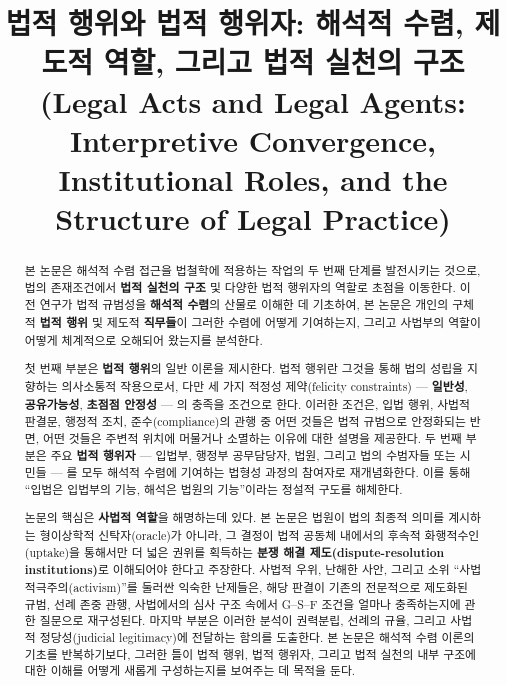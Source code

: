 \documentclass[12pt,a4paper]{article}
\title{%
  \hangulstrongfont 법적 행위와 법적 행위자: 해석적 수렴, 제도적 역할, 그리고 법적 실천의 구조 \\[4pt]
  \normalsize (Legal Acts and Legal Agents: Interpretive Convergence, Institutional Roles, and the Structure of Legal Practice)
}
\begin{document}
\maketitle
\tableofcontents  %
\newpage          %

\begin{abstract}

본 논문은 해석적 수렴 접근을 법철학에 적용하는 작업의 두 번째 단계를
발전시키는 것으로, 법의 존재조건에서 \textbf{법적 실천의 구조} 및 다양한
법적 행위자의 역할로 초점을 이동한다. 이전 연구가 법적 규범성을
\textbf{해석적 수렴}의 산물로 이해한 데 기초하여, 본 논문은 개인의
구체적 \textbf{법적 행위} 및 제도적 \textbf{직무들}이 그러한 수렴에
어떻게 기여하는지, 그리고 사법부의 역할이 어떻게 체계적으로 오해되어
왔는지를 분석한다.

첫 번째 부분은 \textbf{법적 행위}의 일반 이론을 제시한다. 법적 행위란
그것을 통해 법의 성립을 지향하는 의사소통적 작용으로서, 다만 세 가지
적정성 제약(felicity constraints) --- \textbf{일반성},
\textbf{공유가능성}, \textbf{초점점 안정성} --- 의 충족을 조건으로 한다.
이러한 조건은, 입법 행위, 사법적 판결문, 행정적 조치, 준수(compliance)의
관행 중 어떤 것들은 법적 규범으로 안정화되는 반면, 어떤 것들은 주변적
위치에 머물거나 소멸하는 이유에 대한 설명을 제공한다. 두 번째 부분은
주요 \textbf{법적 행위자} --- 입법부, 행정부 공무담당자, 법원, 그리고
법의 수범자들 또는 시민들 --- 를 모두 해석적 수렴에 기여하는 법형성
과정의 참여자로 재개념화한다. 이를 통해 ``입법은 입법부의 기능, 해석은
법원의 기능''이라는 정설적 구도를 해체한다.

논문의 핵심은 \textbf{사법적 역할}을 해명하는데 있다. 본 논문은 법원이
법의 최종적 의미를 계시하는 형이상학적 신탁자(oracle)가 아니라, 그
결정이 법적 공동체 내에서의 후속적 화행적수인(uptake)을 통해서만 더 넓은
권위를 획득하는 \textbf{분쟁 해결 제도(dispute-resolution
institutions)}로 이해되어야 한다고 주장한다. 사법적 우위, 난해한 사안,
그리고 소위 ``사법적극주의(activism)''를 둘러싼 익숙한 난제들은, 해당
판결이 기존의 전문적으로 제도화된 규범, 선례 존중 관행, 사법에서의 심사
구조 속에서 G--S--F 조건을 얼마나 충족하는지에 관한 질문으로 재구성된다.
마지막 부분은 이러한 분석이 권력분립, 선례의 규율, 그리고 사법적
정당성(judicial legitimacy)에 전달하는 함의를 도출한다. 본 논문은 해석적
수렴 이론의 기초를 반복하기보다, 그러한 틀이 법적 행위, 법적 행위자,
그리고 법적 실천의 내부 구조에 대한 이해를 어떻게 새롭게 구성하는지를
보여주는 데 목적을 둔다.

\end{abstract}
\end{document}
